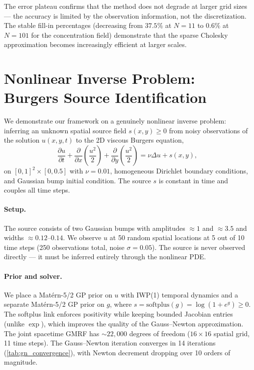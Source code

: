 \documentclass{article}
\theoremstyle{plain}
\theoremstyle{definition}
\theoremstyle{remark}
\begin{document}
The error plateau confirms that the method does not degrade at larger grid sizes --- the accuracy is limited by the observation information, not the discretization.  The stable fill-in percentages (decreasing from $37.5\%$ at $N = 11$ to $0.6\%$ at $N = 101$ for the concentration field) demonstrate that the sparse Cholesky approximation becomes increasingly efficient at larger scales.

\section{Nonlinear Inverse Problem: Burgers Source Identification}
\label{app:burgers-source-id}

We demonstrate our framework on a genuinely nonlinear inverse problem: inferring an unknown spatial source field $s(x,y) \geq 0$ from noisy observations of the solution $u(x,y,t)$ to the 2D viscous Burgers equation,
\begin{equation}
    \frac{\partial u}{\partial t} + \frac{\partial}{\partial x}\!\left(\frac{u^2}{2}\right) + \frac{\partial}{\partial y}\!\left(\frac{u^2}{2}\right) = \nu \Delta u + s(x,y),
    \label{eq:burgers_source}
\end{equation}
on $[0,1]^2 \times [0, 0.5]$ with $\nu = 0.01$, homogeneous Dirichlet boundary conditions, and Gaussian bump initial condition.  The source $s$ is constant in time and couples all time steps.

\paragraph{Setup.}
The source consists of two Gaussian bumps with amplitudes $\approx 1$ and $\approx 3.5$ and widths $\approx 0.12$--$0.14$.  We observe $u$ at 50 random spatial locations at 5 out of 10 time steps (250 observations total, noise $\sigma = 0.05$).  The source is never observed directly --- it must be inferred entirely through the nonlinear PDE.

\paragraph{Prior and solver.}
We place a Mat\'ern-5/2 GP prior on $u$ with IWP(1) temporal dynamics and a separate Mat\'ern-5/2 GP prior on $g$, where $s = \mathrm{softplus}(g) = \log(1 + e^g) \geq 0$.
The softplus link enforces positivity while keeping bounded Jacobian entries (unlike $\exp$), which improves the quality of the Gauss--Newton approximation.
The joint spacetime GMRF has $\sim 22{,}000$ degrees of freedom ($16 \times 16$ spatial grid, 11 time steps).  The Gauss--Newton iteration converges in 14 iterations (\cref{tab:gn_convergence}), with Newton decrement dropping over 10 orders of magnitude.
\end{document}
